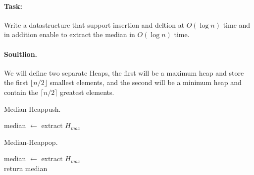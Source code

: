\paragraph{Task:}Write a datastructure that support insertion and deltion at $O\left( \log n \right) $ time and in addition enable to extract the median in $O\left( \log n  \right)$ time. 

\paragraph{Soultlion.} We will define two separate Heaps, the first will be a maximum heap and store the first $ \lfloor n/2 \rfloor $ smallest elements, and the second will be a minimum heap and contain the $ \lceil n/2 \rceil$ greatest elements. 

\begin{algbox}{Median-Heappush.}
\begin{algorithm}[H]

median $\leftarrow$ extract $H_{max}$  \\
\end{algorithm}
\end{algbox}

\begin{algbox}{Median-Heappop.}
\begin{algorithm}[H]
median $\leftarrow$ extract $H_{max}$ \\   
return median 
\end{algorithm}
\end{algbox}

\begin{figure}[h]
  \centering
  \begin{subfigure}[b]{0.49\textwidth}
	
  \end{subfigure}
\begin{subfigure}[b]{0.49\textwidth}
	
  \end{subfigure}
\end{figure}

